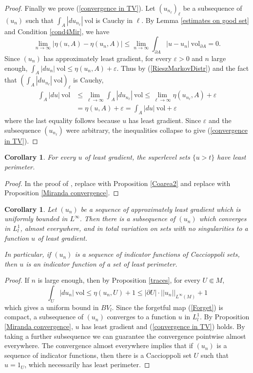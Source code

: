 \documentclass[reqno,12pt,letterpaper]{amsart}
\newcommand{\vol}{\mathrm{vol}}
\newtheorem{corollary}[theorem]{Corollary}
\theoremstyle{definition}
\numberwithin{equation}{section}
\begin{document}
\begin{proof}
Finally we prove (\ref{convergence in TV}).
Let $(u_{n_\ell})_\ell$ be a subsequence of $(u_n)$ such that $\int_A |du_{n_\ell}| ~\vol$ is Cauchy in $\ell$.
By Lemma \ref{estimates on good set} and Condition \ref{cond4Mir}, we have
$$\lim_{n \to \infty} |\eta(u, A) - \eta(u_n, A)| \leq \lim_{n \to \infty} \int_{\partial A} |u - u_n| ~\vol_{\partial A} = 0.$$
Since $(u_n)$ has approximately least gradient, for every $\varepsilon > 0$ and $n$ large enough, $\int_A |du_n| ~\vol \leq \eta(u_n, A) + \varepsilon$.
Thus by (\ref{RieszMarkovDistr}) and the fact that $(\int_A |du_{n_\ell}| ~\vol)_\ell$ is Cauchy,
\begin{align*}
\int_A |du| ~\vol &\leq \lim_{\ell \to \infty} \int_A |du_{n_\ell}| ~\vol \leq \lim_{\ell \to \infty} \eta(u_{n_\ell}, A) + \varepsilon\\
&= \eta(u, A) + \varepsilon = \int_A |du| ~\vol + \varepsilon
\end{align*}
where the last equality follows because $u$ has least gradient.
Since $\varepsilon$ and the subsequence $(u_{n_\ell})$ were arbitrary, the inequalities collapse to give (\ref{convergence in TV}).
\end{proof}

\begin{corollary}\label{level sets are minimal}
For every $u$ of least gradient, the superlevel sets $\{u > t\}$ have least perimeter.
\end{corollary}
\begin{proof}
In the proof of \cite[Theorem 1]{BOMBIERI1969}, replace \cite[Theorem 1.6]{Miranda66} with Proposition \ref{Coarea2} and replace \cite[Theorem 3]{Miranda67} with Proposition \ref{Miranda convergence}.
\end{proof}

\begin{corollary}\label{compactness}
Let $(u_n)$ be a sequence of approximately least gradient which is uniformly bounded in $L^\infty$.
Then there is a subsequence of $(u_n)$ which converges in $L^1_l$, almost everywhere, and in total variation on sets with no singularities to a function $u$ of least gradient.

In particular, if $(u_n)$ is a sequence of indicator functions of Caccioppoli sets, then $u$ is an indicator function of a set of least perimeter.
\end{corollary}
\begin{proof}
If $n$ is large enough, then by Proposition \ref{traces}, for every $U \Subset M$,
$$\int_U |du_n| ~\vol \leq \eta(u_n, U) + 1 \leq |\partial U|\cdot ||u_n||_{L^\infty(M)} + 1$$
which gives a uniform bound in $BV_l$.
Since the forgetful map (\ref{Forget}) is compact, a subsequence of $(u_n)$ converges to a function $u$ in $L^1_l$.
By Proposition \ref{Miranda convergence}, $u$ has least gradient and (\ref{convergence in TV}) holds.
By taking a further subsequence we can guarantee the convergence pointwise almost everywhere.
The convergence almost everywhere implies that if $(u_n)$ is a sequence of indicator functions, then there is a Caccioppoli set $U$ such that $u = 1_U$, which necessarily has least perimeter.
\end{proof}
\end{document}
